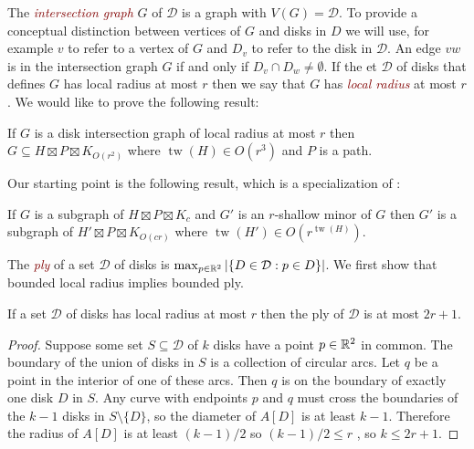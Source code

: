 \documentclass{patmorin}
\newcommand{\defin}[1]{\textcolor{Maroon}{\emph{#1}}}
\DeclareMathOperator{\tw}{tw}
\begin{document}
The \defin{intersection graph} $G$ of $\mathcal{D}$ is a graph with $V(G)=\mathcal{D}$. To provide a conceptual distinction between vertices of $G$ and disks in $D$ we will use, for example $v$ to refer to a vertex of $G$ and $D_v$ to refer to the disk in $\mathcal{D}$.  An edge $vw$ is in the intersection graph $G$ if and only if $D_v\cap D_w\neq\emptyset$.  If the et $\mathcal{D}$ of disks that defines $G$ has local radius at most $r$ then we say that $G$ has \defin{local radius} at most $r$.  We would like to prove the following result:

\begin{thm}\label{radius_product}
   If $G$ is a disk intersection graph of local radius at most $r$ then  $G\subseteq H\boxtimes P\boxtimes K_{O(r^2)}$ where $\tw(H)\in O(r^3)$ and $P$ is a path.
\end{thm}

Our starting point is the following result, which is a specialization of \citet[Theorem~7]{hickingbotham.wood:shallow}:

\begin{thm}\label{h_w_shallow_minor}
  If $G$ is a subgraph of $H\boxtimes P\boxtimes K_c$ and $G'$ is an $r$-shallow minor of $G$ then $G'$ is a subgraph of $H' \boxtimes P \boxtimes K_{O(cr)}$ where $\tw(H') \in O(r^{\tw(H)})$.
\end{thm}

The \defin{ply} of a set $\mathcal{D}$ of disks is $\max_{p\in\mathbb{R}^2}|\{D\in\mathcal{D}:p\in D\}|$.  We first show that bounded local radius implies bounded ply.

\begin{lem}\label{ply}
  If a set $\mathcal{D}$ of disks has local radius at most $r$ then the ply of $\mathcal{D}$ is at most $2r+1$.
\end{lem}

\begin{proof}
  Suppose some set $S\subseteq\mathcal{D}$ of $k$ disks have a point $p\in \mathbb{R}^2$ in common.  The boundary of the union of disks in $S$ is a collection of circular arcs.  Let $q$ be a point in the interior of one of these arcs.  Then $q$ is on the boundary of exactly one disk $D$ in $S$.  Any curve with endpoints $p$ and $q$ must cross the boundaries of the $k-1$ disks in $S \setminus \{D\}$, so the diameter of $A[D]$ is at least $k-1$.  Therefore the radius of $A[D]$ is at least $(k-1)/2$ so $(k - 1)/2 \le r$ , so $k \le  2r+1$.
\end{proof}
\end{document}
